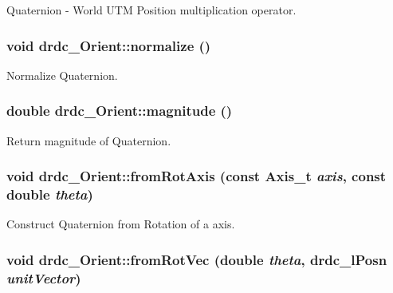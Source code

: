 Quaternion - World UTM Position multiplication operator. 

\hypertarget{classdrdc__Orient_e40486f5bc35f27bf563d804809b2c59}{
\subsubsection[normalize]{\setlength{\rightskip}{0pt plus 5cm}void drdc\_\-Orient::normalize ()}}
\label{classdrdc__Orient_e40486f5bc35f27bf563d804809b2c59}


Normalize Quaternion. 

\hypertarget{classdrdc__Orient_c98cece704beda15a8863dc7b3b4a399}{
\subsubsection[magnitude]{\setlength{\rightskip}{0pt plus 5cm}double drdc\_\-Orient::magnitude ()}}
\label{classdrdc__Orient_c98cece704beda15a8863dc7b3b4a399}


Return magnitude of Quaternion. 

\hypertarget{classdrdc__Orient_5589a587543a4136a6dc7414970ae9f7}{
\subsubsection[fromRotAxis]{\setlength{\rightskip}{0pt plus 5cm}void drdc\_\-Orient::fromRotAxis (const {\bf Axis\_\-t} {\em axis}, \/  const double {\em theta})}}
\label{classdrdc__Orient_5589a587543a4136a6dc7414970ae9f7}


Construct Quaternion from Rotation of a axis. 

\hypertarget{classdrdc__Orient_4850f51a9a34c81ffbe72b60cfeb4359}{
\subsubsection[fromRotVec]{\setlength{\rightskip}{0pt plus 5cm}void drdc\_\-Orient::fromRotVec (double {\em theta}, \/  {\bf drdc\_\-lPosn} {\em unitVector})}}
\label{classdrdc__Orient_4850f51a9a34c81ffbe72b60cfeb4359}


